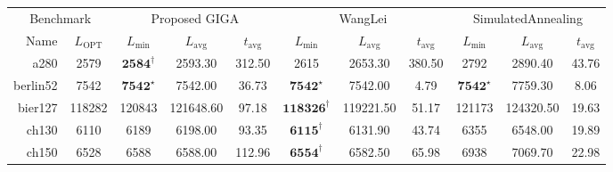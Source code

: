 \documentclass[12pt]{ctexart}
\begin{document}
\newpage
\begin{table}[htbp]
    \scriptsize
    \centering
    \begin{tabular}{rcccccccccc}
        \toprule
        \multicolumn{2}{c}{Benchmark} & \multicolumn{3}{c}{Proposed GIGA} & \multicolumn{3}{c}{WangLei} & \multicolumn{3}{c}{SimulatedAnnealing}                                                                                                                                                  \\
        \cmidrule(l){1-2} \cmidrule(l){3-5} \cmidrule(l){6-8} \cmidrule(l){9-11}
        Name                          & $L_{\text{OPT}}$                  & $L_{\min}$                  & $L_{\text{avg}}$                       & $t_{\text{avg}}$ & $L_{\min}$              & $L_{\text{avg}}$ & $t_{\text{avg}}$ & $L_{\min}$            & $L_{\text{avg}}$ & $t_{\text{avg}}$ \\
        \midrule
        a280                          & 2579                              & $\textbf{2584}^\dag$        & 2593.30                                & 312.50           & 2615                    & 2653.30          & 380.50           & 2792                  & 2890.40          & 43.76            \\
        berlin52                      & 7542                              & $\textbf{7542}^\star$       & 7542.00                                & 36.73            & $\textbf{7542}^\star$   & 7542.00          & 4.79             & $\textbf{7542}^\star$ & 7759.30          & 8.06             \\
        bier127                       & 118282                            & 120843                      & 121648.60                              & 97.18            & $\textbf{118326}^\dag$  & 119221.50        & 51.17            & 121173                & 124320.50        & 19.63            \\
        ch130                         & 6110                              & 6189                        & 6198.00                                & 93.35            & $\textbf{6115}^\dag$    & 6131.90          & 43.74            & 6355                  & 6548.00          & 19.89            \\
        ch150                         & 6528                              & 6588                        & 6588.00                                & 112.96           & $\textbf{6554}^\dag$    & 6582.50          & 65.98            & 6938                  & 7069.70          & 22.98            \\

\end{tabular}
\end{table}
\end{document}
